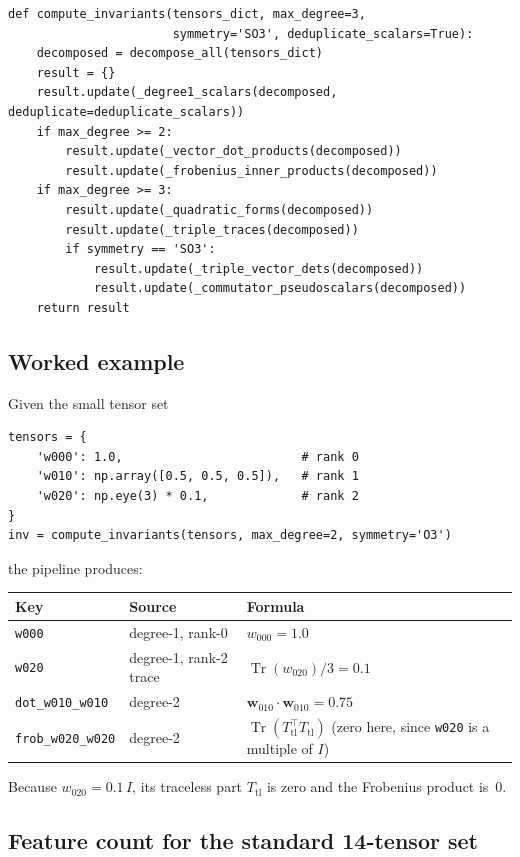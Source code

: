 \documentclass[11pt,a4paper]{article}
\begin{document}
\begin{lstlisting}
def compute_invariants(tensors_dict, max_degree=3,
                       symmetry='SO3', deduplicate_scalars=True):
    decomposed = decompose_all(tensors_dict)
    result = {}
    result.update(_degree1_scalars(decomposed, deduplicate=deduplicate_scalars))
    if max_degree >= 2:
        result.update(_vector_dot_products(decomposed))
        result.update(_frobenius_inner_products(decomposed))
    if max_degree >= 3:
        result.update(_quadratic_forms(decomposed))
        result.update(_triple_traces(decomposed))
        if symmetry == 'SO3':
            result.update(_triple_vector_dets(decomposed))
            result.update(_commutator_pseudoscalars(decomposed))
    return result
\end{lstlisting}

\subsection*{Worked example}

Given the small tensor set
\begin{lstlisting}
tensors = {
    'w000': 1.0,                         # rank 0
    'w010': np.array([0.5, 0.5, 0.5]),   # rank 1
    'w020': np.eye(3) * 0.1,             # rank 2
}
inv = compute_invariants(tensors, max_degree=2, symmetry='O3')
\end{lstlisting}
the pipeline produces:

\begin{center}
\begin{tabular}{lll}
\toprule
Key & Source & Formula \\
\midrule
\texttt{w000} & degree-1, rank-0 & $w_{000} = 1.0$ \\
\texttt{w020} & degree-1, rank-2 trace & $\operatorname{Tr}(w_{020})/3 = 0.1$ \\
\texttt{dot\_w010\_w010} & degree-2 & $\mathbf{w}_{010} \cdot \mathbf{w}_{010} = 0.75$ \\
\texttt{frob\_w020\_w020} & degree-2 & $\operatorname{Tr}(T_{\text{tl}}^\top T_{\text{tl}})$
  (zero here, since \texttt{w020} is a multiple of $I$) \\
\bottomrule
\end{tabular}
\end{center}

\noindent
Because $w_{020} = 0.1\,I$, its traceless part $T_{\text{tl}}$ is zero and the
Frobenius product is~0.

\subsection*{Feature count for the standard 14-tensor set}
\end{document}
